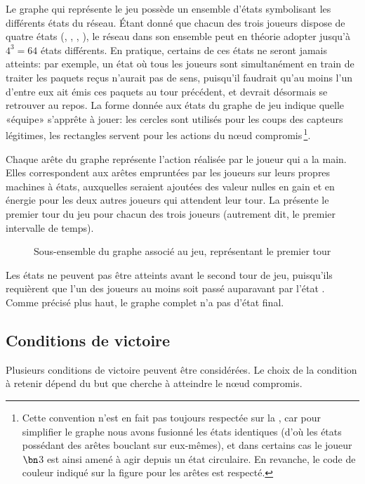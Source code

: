 Le graphe qui représente le jeu possède un ensemble d'états symbolisant les différents états du réseau.
Étant donné que chacun des trois joueurs dispose de quatre états (\idle, \send, \listen, \treatmsg), le réseau dans son ensemble peut en théorie adopter jusqu'à $4^3=64$ états différents.
En pratique, certains de ces états ne seront jamais atteints: par exemple, un état où tous les joueurs sont simultanément en train de traiter les paquets reçus n'aurait pas de sens, puisqu'il faudrait qu'au moins l'un d'entre eux ait émis ces paquets au tour précédent, et devrait désormais se retrouver au repos.
La forme donnée aux états du graphe de jeu indique quelle «équipe» s'apprête à jouer: les cercles sont utilisés pour les coups des capteurs légitimes, les rectangles servent pour les actions du nœud compromis\,\footnote{Cette convention n'est en fait pas toujours respectée sur la , car pour simplifier le graphe nous avons fusionné les états identiques (d'où les états possédant des arêtes bouclant sur eux-mêmes), et dans certains cas le joueur $\bn$3 est ainsi amené à agir depuis un état circulaire. En revanche, le code de couleur indiqué sur la figure pour les arêtes est respecté.}.

Chaque arête du graphe représente l'action réalisée par le joueur qui a la main.
Elles correspondent aux arêtes empruntées par les joueurs sur leurs propres machines à états, auxquelles seraient ajoutées des valeur nulles en gain et en énergie pour les deux autres joueurs qui attendent leur tour.
La  présente le premier tour du jeu pour chacun des trois joueurs (autrement dit, le premier intervalle de temps).
\begin{figure}[p]
    \centering
    
    \caption{Sous-ensemble du graphe associé au jeu, représentant le premier tour}\label{tj:fig:autFirstTurn}
\end{figure}
Les états \treatmsg ne peuvent pas être atteints avant le second tour de jeu, puisqu'ils requièrent que l'un des joueurs au moins soit passé auparavant par l'état \listen.
Comme précisé plus haut, le graphe complet n'a pas d'état final.

    \subsection{Conditions de victoire}

Plusieurs conditions de victoire peuvent être considérées.
Le choix de la condition à retenir dépend du but que cherche à atteindre le nœud compromis.

